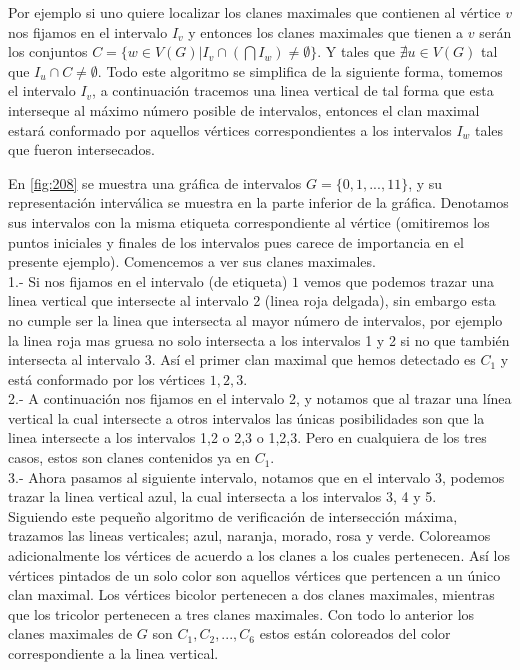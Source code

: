 Por ejemplo si uno quiere localizar los clanes maximales que contienen al vértice $v$ nos fijamos en el intervalo $I_v$ y entonces los clanes maximales que tienen a $v$ serán los conjuntos $C = \{w \in V(G)| I_v \cap (\bigcap I_w) \neq \emptyset\}$.
Y tales que $\nexists u \in V(G)$ tal que $I_u \cap C \neq \emptyset$.
Todo este algoritmo se simplifica de la siguiente forma, tomemos el intervalo $I_v$, a continuación tracemos una linea vertical de tal forma que esta interseque al máximo número posible de intervalos, entonces el clan maximal estará conformado por aquellos vértices correspondientes a los intervalos $I_w$ tales que fueron intersecados.  

En \cref{fig:208} se muestra una gráfica de intervalos $G=\{ 0,1, ..., 11\}$, y su representación interválica se muestra en la parte inferior de la gráfica. Denotamos sus intervalos con la misma etiqueta correspondiente al vértice (omitiremos los puntos iniciales y finales de los intervalos pues carece de importancia en el presente ejemplo).     
Comencemos a ver sus clanes maximales.\\
1.- Si nos fijamos en el intervalo (de etiqueta) $1$ vemos que podemos trazar una linea vertical que intersecte al intervalo 2 (linea roja delgada), sin embargo esta no cumple ser la linea que intersecta al mayor número de intervalos, por ejemplo la linea roja mas gruesa no solo intersecta a los intervalos 1 y 2 si no que también intersecta al intervalo 3. Así el primer clan maximal que hemos detectado es $C_1$ y está conformado por los vértices $1,2,3$.\\
2.- A continuación nos fijamos en el intervalo 2, y notamos que al trazar una línea vertical la cual intersecte a otros intervalos las únicas posibilidades son que la linea intersecte a los intervalos 1,2 o 2,3 o 1,2,3. Pero en cualquiera de los tres casos, estos son clanes contenidos ya en $C_1$.\\
3.- Ahora pasamos al siguiente intervalo, notamos que en el intervalo 3, podemos trazar la linea vertical azul, la cual intersecta a los intervalos 3, 4 y 5. \\
Siguiendo este pequeño algoritmo de verificación de intersección máxima, trazamos las lineas verticales; azul, naranja, morado, rosa y verde. Coloreamos adicionalmente los vértices de acuerdo a los clanes a los cuales pertenecen. Así los vértices pintados de un solo color son aquellos vértices que pertencen a un  único clan maximal. Los vértices bicolor pertenecen a dos clanes maximales, mientras que los tricolor pertenecen a tres clanes maximales. Con todo lo anterior los clanes maximales de $G$ son $C_1, C_2, ..., C_6$ estos están coloreados del color correspondiente a la linea vertical.    


